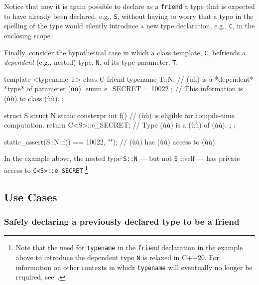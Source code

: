 \noindent Notice that now it is again possible to declare as a \lstinline!friend! a
type that is expected to have already been declared, e.g., \lstinline!S!,
without having to worry that a typo in the spelling of the type would
silently introduce a new type declaration, e.g., \lstinline!C!, in the
enclosing scope.

Finally, consider the hypothetical case in which a class template,
\lstinline!C!, befriends a \emph{dependent} (e.g., nested) type, \lstinline!N!,
of its type parameter, \lstinline!T!:

\begin{emcppslisting}[emcppsbatch=e6]
template <typename T>
class C
{
    friend typename T::N;       // (ù{}ù) is a *dependent* *type* of parameter (ù{}ù).
    enum { e_SECRET = 10022 };  // This information is (ù{}ù) to class (ù{}ù).
};

struct S
{
    struct N
    {
        static constexpr int f()  // (ù{}ù) is eligible for compile-time computation.
        {
            return C<S>::e_SECRET;  // Type (ù{}ù) is a (ù{}ù) of (ù{}ù).
        }
    };
};

static_assert(S::N::f() == 10022, "");  // (ù{}ù) has (ù{}ù) access to (ù{}ù).
\end{emcppslisting}
    
\noindent In the example above, the nested type \lstinline!S::N! --- but not
\lstinline!S! itself --- has private access to \lstinline!C<S>::e_SECRET!.{\cprotect\footnote{Note that the need for \lstinline!typename! in the \lstinline!friend!
declaration in the example above to introduce the dependent type \lstinline!N! is relaxed
in C++20. For information on other contexts in which
\lstinline!typename! will eventually no longer be required, see~\cite{meredith20}.}}

\subsection[Use Cases]{Use Cases}\label{use-cases}

\subsubsection[Safely declaring a previously declared type to be a friend]{Safely declaring a previously declared type to be a friend}\label{safely-declaring-a-previously-declared-type-to-be-a-friend}

